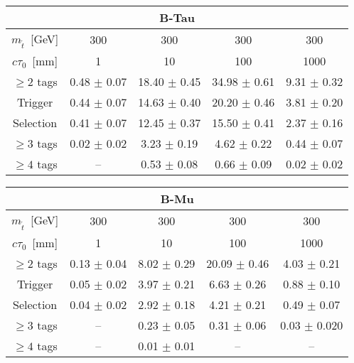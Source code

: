 \begin{table}[tb]
\begin{center}
\begin{tabular}{ccccc} 
\multicolumn{5}{c}{\textbf{B-Tau}} \\
 \hline 
$m_{\tilde{t}}$~[GeV] & 300 & 300 & 300 & 300 \\ 
 $c\tau_0$~[mm] & 1 & 10 & 100 & 1000 \\ 
\hline 
$\geq 2$ tags & 0.48 $\pm$ 0.07 & 18.40 $\pm$ 0.45  & 34.98 $\pm$ 0.61  & 9.31 $\pm$ 0.32   \\ 
Trigger       & 0.44 $\pm$ 0.07 & 14.63 $\pm$ 0.40  & 20.20 $\pm$ 0.46  & 3.81 $\pm$ 0.20   \\ 
Selection     & 0.41 $\pm$ 0.07 & 12.45 $\pm$ 0.37  & 15.50 $\pm$ 0.41  & 2.37 $\pm$ 0.16   \\ 
$\geq 3$ tags & 0.02 $\pm$ 0.02 & 3.23 $\pm$ 0.19   & 4.62 $\pm$ 0.22   & 0.44 $\pm$ 0.07 \\ 
$\geq 4$ tags & --                & 0.53 $\pm$ 0.08 & 0.66 $\pm$ 0.09   & 0.02 $\pm$ 0.02 \\ 
\end{tabular}

\begin{tabular}{ccccc} 
\multicolumn{5}{c}{\textbf{B-Mu}} \\
 \hline 
 $m_{\tilde{t}}$~[GeV] & 300 & 300 & 300 & 300 \\ 
 $c\tau_0$~[mm] & 1 & 10 & 100 & 1000 \\ 
 \hline 
  $\geq 2$ tags     & 0.13 $\pm$ 0.04 & 8.02 $\pm$ 0.29   & 20.09 $\pm$ 0.46  & 4.03 $\pm$ 0.21   \\ 
   Trigger          & 0.05 $\pm$ 0.02 & 3.97 $\pm$ 0.21   & 6.63 $\pm$ 0.26   & 0.88 $\pm$ 0.10 \\ 
    Selection       & 0.04 $\pm$ 0.02 & 2.92 $\pm$ 0.18   & 4.21 $\pm$ 0.21   & 0.49 $\pm$ 0.07 \\ 
     $\geq 3$ tags  & --                & 0.23 $\pm$ 0.05 & 0.31 $\pm$ 0.06 & 0.03 $\pm$ 0.020 \\ 
      $\geq 4$ tags & --                & 0.01 $\pm$ 0.01 & --                & --                \\ 
\end{tabular}
\end{center}
\end{table}

